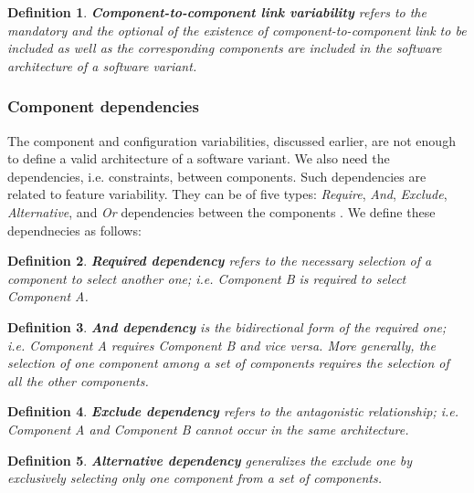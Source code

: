 \documentclass[graybox]{svmult}
\newtheorem{mydef}{Definition}
\begin{document}

\begin{mydef}
\textbf{Component-to-component link variability} refers to the mandatory and the optional of the existence of component-to-component link to be included as well as the corresponding components are included in the software architecture of a software variant.
\end{mydef}



 \subsubsection{Component dependencies}


The component and configuration variabilities, discussed earlier, are not enough to define a valid architecture of a software variant. We also need the  dependencies, i.e. constraints, between components. Such dependencies are related to feature variability. They can be of five types: \textit{Require}, \textit{And},  \textit{Exclude}, \textit{Alternative}, and \textit{Or} dependencies between the components \cite{shatnawi2017recovering}. We define these dependnecies as follows:
    
\begin{mydef}
\textbf{Required dependency} refers to the necessary selection of a component to select another one; i.e. \textit{Component B} is required to select \textit{Component A}.
\end{mydef}

\begin{mydef}
\textbf{And dependency} is the bidirectional form of the required one; i.e. \textit{Component A} requires \textit{Component B} and vice versa. More generally, the selection of one component among a set of components requires the selection of all the other components.
\end{mydef}

\begin{mydef}
\textbf{Exclude dependency} refers to the antagonistic relationship; i.e. \textit{Component A} and \textit{Component B} cannot occur in the same architecture.
\end{mydef}

\begin{mydef}
\textbf{Alternative dependency} generalizes the exclude one by exclusively selecting only one component from a set of components.
\end{mydef}
\end{document}
